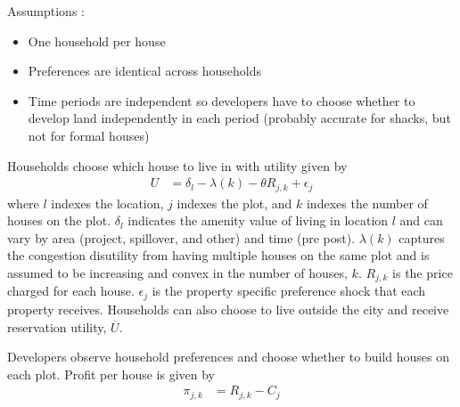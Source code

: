 \documentclass[12pt]{article}
\begin{document}
Assumptions :
\begin{itemize}
\item One household per house
\item Preferences are identical across households
\item Time periods are independent so developers have to choose whether to develop land independently in each period (probably accurate for shacks, but not for formal houses)
\end{itemize}

Households choose which house to live in with utility given by
\begin{align*}
U &= \delta_{l} - \lambda(k) - \theta R_{j,k}   + \epsilon_j  
\end{align*}
\noindent where $l$ indexes the location, $j$ indexes the plot, and $k$ indexes the number of houses on the plot.  $\delta_{l}$ indicates the amenity value of living in location $l$ and can vary by area (project, spillover, and other) and time (pre post).  $\lambda(k)$ captures the congestion disutility from having multiple houses on the same plot and is assumed to be increasing and convex in the number of houses, $k$.  $R_{j,k}$ is the price charged for each house.  $\epsilon_j$ is the property specific preference shock that each property receives.  Households can also choose to live outside the city and receive reservation utility, $\overline{U}$.  

Developers observe household preferences and choose whether to build houses on each plot.  Profit per house is given by
\begin{align*}
\pi_{j,k} &= R_{j,k} - C_{j} 
\end{align*}


\end{document}
